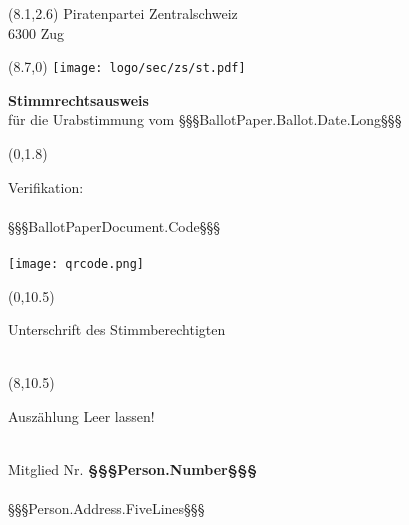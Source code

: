 ﻿\documentclass[11pt, a4paper]{scrartcl}
\begin{document}
\setlength{\parindent}{0cm}


\begin{textblock}{9}(8.1,2.6)
Piratenpartei Zentralschweiz \\
6300 Zug \\
\end{textblock}

\begin{textblock}{6}(8.7,0)
\texttt{[image: logo/sec/zs/st.pdf]}
\end{textblock}

{\LARGE\textbf{Stimmrechtsausweis}} \\
für die Urabstimmung vom §§§BallotPaper.Ballot.Date.Long§§§ \\

\vspace{1cm}

\begin{textblock}{6}(0,1.8)
\raggedright
Verifikation: \\
~ \\
§§§BallotPaperDocument.Code§§§ \\
~ \\
\texttt{[image: qrcode.png]}
\end{textblock}

\begin{textblock}{6.5}(0,10.5)
\begin{framed}
Unterschrift des Stimmberechtigten \\
\vspace{2.5cm} ~ \\
\end{framed}
\end{textblock}

\begin{textblock}{6.5}(8,10.5)
\begin{framed}
Auszählung \hfill Leer lassen! \\
\vspace{2.5cm} ~ \\
\end{framed}
\end{textblock}

Mitglied Nr. \textbf{§§§Person.Number§§§}   \\
~ \\
§§§Person.Address.FiveLines§§§

\vspace{10cm}
\end{document}
